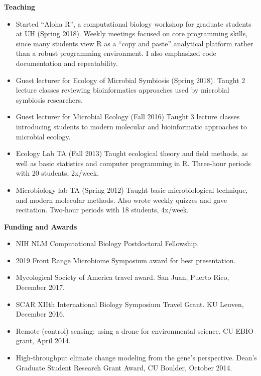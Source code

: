 \documentclass{article}
\begin{document}
\vspace{3mm}
{\large  \textbf{Teaching}}
\begin{itemize}[noitemsep,topsep=0pt, leftmargin=5mm]
  \item Started “Aloha R”, a computational biology workshop for graduate students at UH (Spring 2018). Weekly meetings focused on core programming skills, since many students view R as a “copy and paste” analytical platform rather than a robust programming environment. I also emphasized code documentation and repeatability.
  \item Guest lecturer for Ecology of Microbial Symbiosis (Spring 2018). Taught 2 lecture classes reviewing bioinformatics approaches used by microbial symbiosis researchers.
  \item Guest lecturer for Microbial Ecology (Fall 2016) Taught 3 lecture classes introducing students to modern molecular and bioinformatic approaches to microbial ecology.
  \item Ecology Lab TA (Fall 2013) Taught ecological theory and field methods, as well as basic statistics and computer programming in R. Three-hour periods with 20 students, 2x/week.
  \item Microbiology lab TA (Spring 2012) Taught basic microbiological technique, and modern molecular methods. Also wrote weekly quizzes and gave recitation. Two-hour periods with 18 students, 4x/week.
\end{itemize}
\vspace{3mm}
{\large  \textbf{Funding and Awards}}
\begin{itemize}[noitemsep,topsep=0pt, leftmargin=5mm]
  \item NIH NLM Computational Biology Postdoctoral Fellowship.
  \item 2019 Front Range Microbiome Symposium award for best presentation.
  \item Mycological Society of America travel award. San Juan, Puerto Rico, December 2017.
  \item SCAR XIIth International Biology Symposium Travel Grant. KU Leuven, December 2016.
  \item Remote (control) sensing: using a drone for environmental science. CU EBIO grant, April 2014.
  \item High-throughput climate change modeling from the gene’s perspective. Dean’s Graduate Student Research Grant Award, CU Boulder, October 2014.
\end{itemize}
\vspace{3mm}
\end{document}
